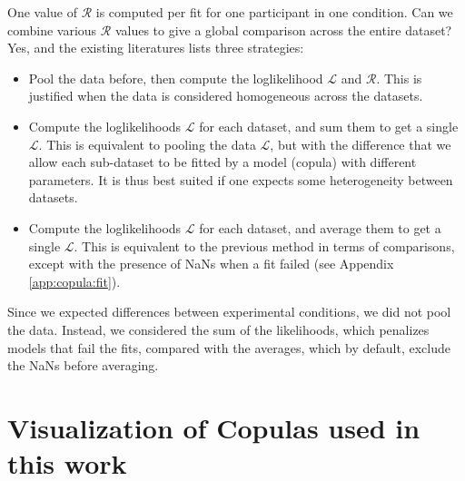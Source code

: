 \documentclass[acmlarge, manuscript,review]{acmart}
\begin{document}
One value of $\mathcal{R}$ is computed per fit \eg for one participant in one condition. Can we combine various $\mathcal{R}$ values to give a global comparison across the entire dataset?
Yes, and the existing literatures lists three strategies:
\begin{itemize}
  \item Pool the data before, then compute the loglikelihood $\mathcal{L}$ and $\mathcal{R}$. This is justified when the data is considered homogeneous across the datasets.
  \item Compute the loglikelihoods $\mathcal{L}$ for each dataset, and sum them to get a single $\mathcal{L}$. This is equivalent to pooling the data $\mathcal{L}$, but with the difference that we allow each sub-dataset to be fitted by a model (copula) with different parameters. It is thus best suited if one expects some heterogeneity between datasets.
  \item Compute the loglikelihoods $\mathcal{L}$ for each dataset, and average them to get a single $\mathcal{L}$. This is equivalent to the previous method in terms of comparisons, except with the presence of NaNs when a fit failed (see Appendix \ref{app:copula:fit}).
\end{itemize}
Since we expected differences between experimental conditions, we did not pool the data. Instead, we considered the sum of the likelihoods, which penalizes models that fail the fits, compared with the averages, which by default, exclude the NaNs before averaging.

\section{Visualization of Copulas used in this work}
\end{document}
